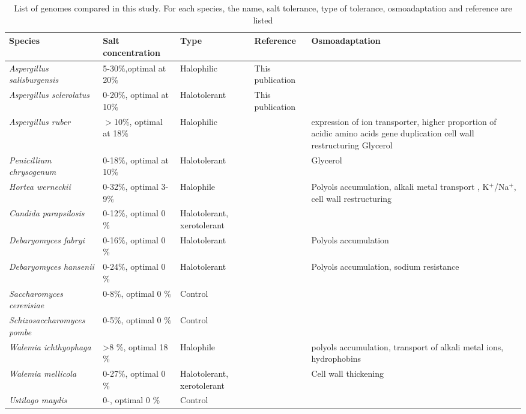 \documentclass[jof,article,submit,moreauthors,pdftex,10pt,a4paper]{Definitions/mdpi}
\newcommand{\horWer}{\textit{Hortea werneckii}}
\newcommand{\aspRub}{\textit{Aspergillus ruber}}
\newcommand{\penChr}{\textit{Penicillium chrysogenum}}
\newcommand{\debFab}{\textit{Debaryomyces fabryi}}
\newcommand{\debHan}{\textit{Debaryomyces hansenii}}
\newcommand{\walIch}{\textit{Walemia ichthyophaga}}
\newcommand{\walMel}{\textit{Walemia mellicola}}
\newcommand{\canPar}{\textit{Candida parapsilosis}}
\newcommand{\sacCer}{\textit{Saccharomyces cerevisiae}}
\newcommand{\schPom}{\textit{Schizosaccharomyces pombe}}
\newcommand{\phiSp}{\textit{Aspergillus salisburgensis}}
\newcommand{\phiScl}{\textit{Aspergillus sclerolatus}}
\newcommand{\ustMay}{\textit{Ustilago maydis}}
\begin{document}
\begin{table}
  \begin{center}
    \small
    \begin{tabular}{|l|l|p{2cm}|l|p{5cm}|}
      \hline
      Species   & Salt concentration & Type & Reference & Osmoadaptation \\
      \hline
      {\phiSp}  & 5-30$\%$,optimal at 20$\%$ & Halophilic &
      This publication &\\ 
      {\phiScl} & 0-20$\%$, optimal at 10$\%$ & Halotolerant & This publication &\\
      {\aspRub} & $>$10$\%$,  optimal at 18$\%$&  Halophilic
      &\cite{Kis2014}&       expression of ion transporter, higher
      proportion of acidic amino acids gene duplication cell wall restructuring
      Glycerol\\
      {\penChr} & 0-18$\%$, optimal at 10$\%$ & Halotolerant
      &\cite{Attaby2001}& Glycerol \\
      {\horWer} & 0-32$\%$, optimal 3-9$\%$ & Halophile   &
      \cite{Plemenitas2015}& Polyols accumulation, alkali metal
      transport , K$^+$/Na$^+$, cell wall restructuring\\
      {\canPar} & 0-12$\%$, optimal 0 $\%$ & Halotolerant, xerotolerant & \cite{Krauke2010}&\\
      {\debFab} & 0-16$\%$, optimal 0 $\%$ & Halotolerant &
      \cite{Michan2013}& Polyols accumulation\\
      {\debHan} & 0-24$\%$, optimal 0 $\%$ & Halotolerant & \cite{Michan2013}& Polyols accumulation, sodium resistance\\
      {\sacCer} & 0-8$\%$, optimal 0 $\%$ & Control & \cite{Lages1999}&\\
      {\schPom} & 0-5$\%$, optimal 0 $\%$ & Control & \cite{Lages1999}&\\
      {\walIch} & >8 $\%$, optimal 18 $\%$ & Halophile &
      ~\cite{Zajc2013} & polyols accumulation, transport of alkali metal
      ions, hydrophobins\\
      {\walMel} & 0-27$\%$, optimal 0 $\%$ & Halotolerant,
      xerotolerant & ~\cite{Kuncic2010} & Cell wall thickening\\
      {\ustMay} & 0-, optimal 0 $\%$ & Control & \cite{Salmern2011} &\\
      \hline
    \end{tabular}
    \caption{\label{tab:species} List of genomes compared in this
      study. For each species, the name, salt tolerance, type of
      tolerance, osmoadaptation and reference are listed}
    
  \end{center}
\end{table}
\end{document}
